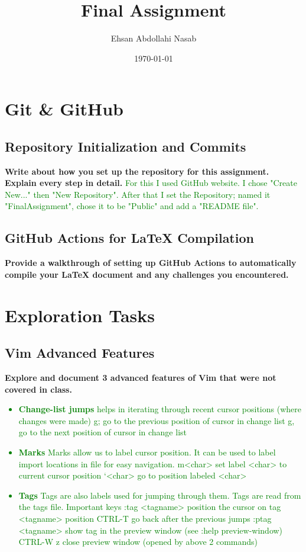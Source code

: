 \documentclass{article}
\title{Final Assignment}
\author{Ehsan Abdollahi Nasab}
\date{\today}
\begin{document}
\maketitle

\section{Git & GitHub}
\subsection{Repository Initialization and Commits}
\textbf{Write about how you set up the repository for this assignment. Explain every step in detail.}
\textcolor{green}{For this I used GitHub website. I chose "Create New..." then "New Repository". After that I set the Repository; named it "FinalAssignment", chose it to be "Public" and add a "README file".}

\subsection{GitHub Actions for LaTeX Compilation}
\textbf{Provide a walkthrough of setting up GitHub Actions to automatically compile your LaTeX document and any challenges you encountered.}
\textcolor{green}{}

\section{Exploration Tasks}
\subsection{Vim Advanced Features}
\textbf{Explore and document 3 advanced features of Vim that were not covered in class.}
\textcolor{green}{\begin{itemize}
    \item \textbf{Change-list jumps} helps in iterating through recent cursor positions (where changes were made)
    g; go to the previous position of cursor in change list
    g, go to the next position of cursor in change list
    \item \textbf{Marks} Marks allow us to label cursor position. It can be used to label import
    locations in file for easy navigation.
    m<char> set label <char> to current cursor position
    ‘<char> go to position labeled <char>
    \item \textbf{Tags} Tags are also labels used for jumping through them. Tags are read from the
    tags file.
    Important keys
    :tag <tagname> position the cursor on tag <tagname> position
    CTRL-T go back after the previous jumps
    :ptag <tagname> show tag in the preview window (see :help preview-window)
    CTRL-W z close preview window (opened by above 2 commands)\end{itemize}
}
\end{document}

